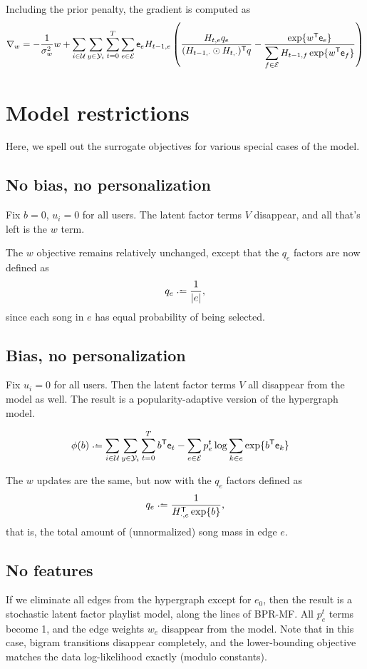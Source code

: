 \documentclass{article}
\def\e{\ensuremath{\mathsf{e}}}
\def\E{\ensuremath{\mathcal{E}}}
\def\U{\ensuremath{\mathcal{U}}}
\begin{document}
Including the prior penalty, the gradient is computed as
\begin{equation}
\nabla_w = -\frac{1}{\sigma_w^2} w + \sum_{i\in\U}\sum_{y\in\Y_i}\sum_{t=0}^T \sum_{e\in\E} \e_e H_{t-1,e} \left(\frac{H_{t,e} q_e}{(H_{t-1,\cdot} \odot H_{t,\cdot})\trans q} - \frac{\exp\{w\trans
\e_e\}}{\displaystyle\sum_{f \in \E} H_{t-1,f} \exp\{w\trans \e_f\}}\right)
\end{equation}

\section{Model restrictions}

Here, we spell out the surrogate objectives for various special cases of the model.

\subsection{No bias, no personalization}
Fix $b=0$, $u_i=0$ for all users.  The latent factor terms $V$ disappear, and all that's left is the $w$ term.

The $w$ objective remains relatively unchanged, except that the $q_e$ factors are now defined as
\[
q_e \defeq \frac{1}{|e|},
\]
since each song in $e$ has equal probability of being selected.

\subsection{Bias, no personalization}

Fix $u_i = 0$ for all users.  Then the latent factor terms $V$ all disappear from the model as well.
The result is a popularity-adaptive version of the hypergraph model.

\begin{align}
\phi(b) &\defeq \sum_{i\in\U}\sum_{y\in\Y_i}\sum_{t=0}^T b\trans \e_t - \sum_{e\in\E} p_e^t \log \sum_{k\in e} \exp\{b\trans \e_k\}
\end{align}

The $w$ updates are the same, but now with the $q_e$ factors defined as
\[
q_e \defeq \frac{1}{H_{\cdot, e}\trans \exp\{b\}},
\]
that is, the total amount of (unnormalized) song mass in edge $e$.

\subsection{No features}
If we eliminate all edges from the hypergraph except for $e_0$, then the result is a stochastic latent factor playlist model, along the lines of BPR-MF.
All $p_e^t$ terms become 1, and the edge weights $w_e$ disappear from the model.  Note that in this case, bigram transitions disappear completely, and the lower-bounding objective 
matches the data log-likelihood exactly (modulo constants).
\end{document}
